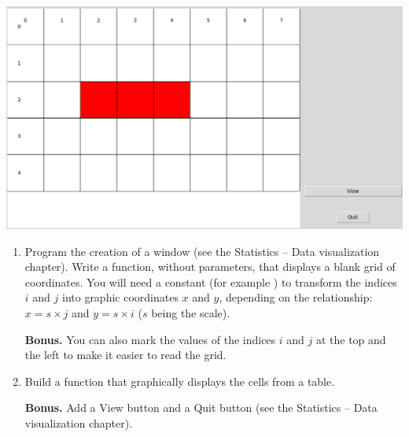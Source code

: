 \documentclass[11pt,class=report,crop=false]{standalone}
\begin{document}
\begin{activite}


\begin{center}
\includegraphics[scale=\myscale,scale=0.3]{screen-life-2-en}
\end{center} 

\begin{enumerate}
  \item Program the creation of a  window (see the \og{}Statistics -- Data visualization\fg{} chapter). Write a  function, without parameters, that displays a blank grid of coordinates. You will need a constant  (for example ) to transform the indices $i$ and $j$ into graphic coordinates $x$ and $y$, depending on the relationship: $x= s \times j$ and $y = s \times i$ ($s$ being the scale).
  
  \textbf{Bonus.} You can also mark the values of the indices $i$ and $j$ at the top and the left to make it easier to read the grid.
  
  \item Build a  function that graphically displays the cells from a table. 
  
  \textbf{Bonus.}  Add a \og{}View\fg{} button and a \og{}Quit\fg{} button
(see the \og{}Statistics -- Data visualization\fg{} chapter).  
  
\end{enumerate}
\end{activite}



\end{document}
